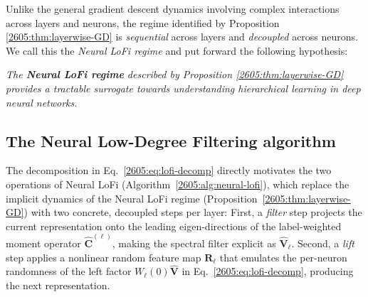 Unlike the general gradient descent dynamics involving complex interactions across layers and neurons, the regime identified by Proposition \ref{2605:thm:layerwise-GD} is {\it sequential} across layers and {\it decoupled} across neurons.  We call this the  {\it Neural LoFi regime} and put forward the following hypothesis:
\begin{center}{\it
    The \textbf{Neural LoFi regime} described by Proposition \ref{2605:thm:layerwise-GD} provides a tractable surrogate towards understanding hierarchical learning in deep neural networks.}
\end{center}



\subsection{The Neural Low-Degree Filtering algorithm}
The decomposition in Eq.~\eqref{2605:eq:lofi-decomp} directly motivates the two operations of Neural LoFi (Algorithm~\ref{2605:alg:neural-lofi}), which replace the implicit dynamics of the Neural LoFi regime (Proposition~\ref{2605:thm:layerwise-GD}) with two concrete, decoupled steps per layer: First, a \emph{filter} step projects the current representation onto the leading eigen-directions of the label-weighted moment operator $\widehat{\bm C}^{(\ell)}$, making the spectral filter explicit as $\widehat{\bm V}_\ell$. Second, a \emph{lift} step applies a nonlinear random feature map $\bm R_\ell$ that emulates the per-neuron randomness of the left factor $W_\ell(0)\hat{\bm V}$ in Eq.~\eqref{2605:eq:lofi-decomp}, producing the next representation.
